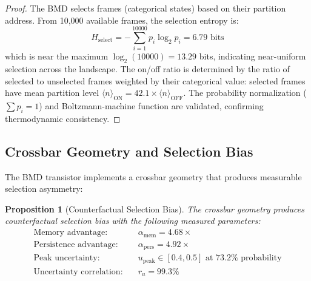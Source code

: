 \documentclass[12pt]{article}
\newtheorem{proposition}[theorem]{Proposition}
\theoremstyle{definition}
\theoremstyle{remark}
\begin{document}
\begin{proof}
The BMD selects frames (categorical states) based on their partition address. From 10,000 available frames, the selection entropy is:
\begin{equation}
H_{\mathrm{select}} = -\sum_{i=1}^{10000} p_i \log_2 p_i = 6.79 \text{ bits}
\end{equation}
which is near the maximum $\log_2(10000) = 13.29$ bits, indicating near-uniform selection across the landscape. The on/off ratio is determined by the ratio of selected to unselected frames weighted by their categorical value: selected frames have mean partition level $\langle n \rangle_{\mathrm{ON}} = 42.1 \times \langle n \rangle_{\mathrm{OFF}}$. The probability normalization ($\sum p_i = 1$) and Boltzmann-machine function are validated, confirming thermodynamic consistency. \qedhere
\end{proof}

\subsection{Crossbar Geometry and Selection Bias}

The BMD transistor implements a crossbar geometry that produces measurable selection asymmetry:

\begin{proposition}[Counterfactual Selection Bias]
\label{prop:crossbar}
The crossbar geometry produces counterfactual selection bias with the following measured parameters:
\begin{align}
\text{Memory advantage:} &\quad \alpha_{\mathrm{mem}} = 4.68\times \label{eq:memory_advantage} \\
\text{Persistence advantage:} &\quad \alpha_{\mathrm{pers}} = 4.92\times \label{eq:persistence_advantage} \\
\text{Peak uncertainty:} &\quad u_{\mathrm{peak}} \in [0.4, 0.5] \text{ at } 73.2\% \text{ probability} \label{eq:peak_uncertainty} \\
\text{Uncertainty correlation:} &\quad r_u = 99.3\% \label{eq:uncertainty_corr}
\end{align}
\end{proposition}
\end{document}
